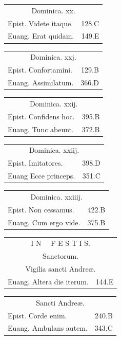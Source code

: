 \documentclass[a5paper,10pt]{book}
\def\ae{æ}
\begin{document}
\begin{multicols}{2}
\begin{tabular}{l r}
\multicolumn{2}{c}{\color{red} Dominica. xx.}\\
Epist. Videte itaque. & 128.C\\
Euang. Erat quidam. & 149.E\\
\end{tabular}
\begin{tabular}{l r}
\multicolumn{2}{c}{\color{red} Dominica. xxj.}\\
Epist. Confortamini. & 129.B\\
Euang. Assimilatum. & 366.D\\
\end{tabular}
\begin{tabular}{l r}
\multicolumn{2}{c}{\color{red} Dominica. xxij.}\\
Epist. Confidens hoc. & 395.B\\
Euang. Tunc abeunt. & 372.B\\
\end{tabular}
\begin{tabular}{l r}
\multicolumn{2}{c}{\color{red} Dominica. xxiij.}\\
Epist. Imitatores. & 398.D\\
Euang Ecce princeps. & 351.C\\%
\end{tabular}
\begin{tabular}{l r}
\multicolumn{2}{c}{\color{red} Dominica. xxiiij.}\\
Epist. Non cessamus. & 422.B\\
Euang. Cum ergo vide. & 375.B\\
\end{tabular}
\begin{tabular}{l r}
\multicolumn{2}{c}{\color{red} \large I N \ \ F E S T I S.}\\
\multicolumn{2}{c}{\color{red} Sanctorum.}\\
\multicolumn{2}{c}{\color{red} Vigilia sancti Andre\ae .}\\
Euang. Altera die iterum. & 144.E\\
\end{tabular}
\begin{tabular}{l r}
\multicolumn{2}{c}{\color{red} Sancti Andre\ae .}\\
Epist. Corde enim. & 240.B\\
Euang. Ambulans autem. & 343.C\\
\end{tabular}
\begin{tabular}{l r}

\end{tabular}
\end{multicols}
\end{document}
